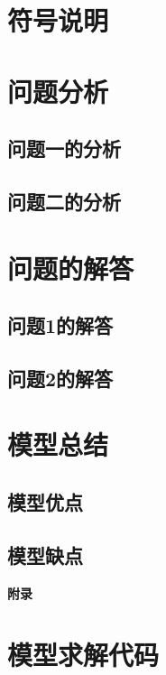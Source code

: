 \documentclass{cumcm}
\begin{document}
\section{符号说明}

\section{问题分析}
\subsection{问题一的分析}

\subsection{问题二的分析}


\section{问题的解答}
\subsection{问题1的解答}

\subsection{问题2的解答}


\section{模型总结}

\subsection{模型优点}

\subsection{模型缺点}





\newpage
\appendix
\textbf{附录}
\section{模型求解代码}
\end{document}
